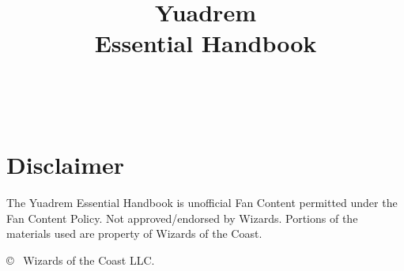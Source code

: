 \documentclass[letterpaper,twocolumn,openany,nodeprecatedcode]{dndbook}
\title{Yuadrem \\
\large Essential Handbook}
\author{}
\date{}
\begin{document}
    \frontmatter
    \maketitle
    \justifying

    \newpage~
    \newpage~\newpage~

    \section*{Disclaimer}
        The Yuadrem Essential Handbook is unofficial Fan Content permitted under the Fan Content Policy.
        Not approved/endorsed by Wizards.
        Portions of the materials used are property of Wizards of the Coast.

        \copyright~ Wizards of the Coast LLC.

    \tableofcontents

    \mainmatter%

    \begin{linenumbers}
    \DndSetThemeColor[DmgCoral]
    
    
    \DndSetThemeColor[DmgLavender]
    
    
    
    
    \DndSetThemeColor[DmgLilac]
    
    
    \DndSetThemeColor[DmgSlateGray]
    
    \end{linenumbers}
\end{document}
